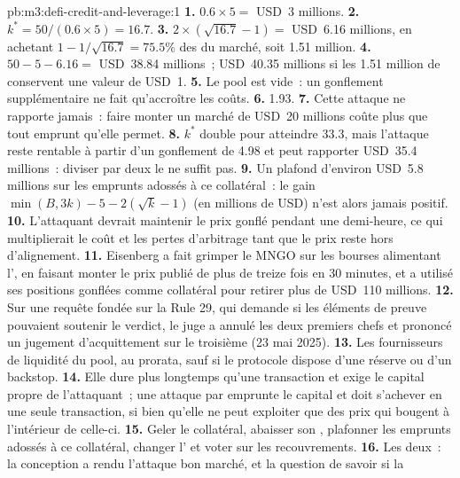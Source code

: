 \begin{solution}{pb:m3:defi-credit-and-leverage:1}
\textbf{1.} $0.6 \times 5 = $ USD~3 millions. \textbf{2.} $k^* = 50/(0.6 \times 5) = 16.7$. \textbf{3.} $2 \times (\sqrt{16.7} - 1) = $ USD~6.16
millions, en achetant $1 - 1/\sqrt{16.7} = 75.5\%$ des  du marché, soit 1.51 million. \textbf{4.} $50 - 5 - 6.16 = $ USD~38.84 millions~; USD~40.35
millions si les 1.51 million de  conservent une valeur de USD~1. \textbf{5.} Le pool est vide~: un gonflement supplémentaire ne fait qu'accroître les coûts. \textbf{6.} 1.93. \textbf{7.} Cette
attaque ne rapporte jamais~: faire monter un marché de USD~20 millions coûte plus que tout emprunt qu'elle permet. \textbf{8.} $k^*$ double pour atteindre 33.3, mais l'attaque reste
rentable à partir d'un gonflement de 4.98 et peut rapporter USD~35.4 millions~: diviser par deux le  ne suffit pas. \textbf{9.} Un plafond d'environ USD~5.8 millions sur les emprunts
adossés à ce collatéral~: le gain $\min(B, 3k) - 5 - 2(\sqrt{k} - 1)$ (en millions de USD) n'est alors jamais positif. \textbf{10.} L'attaquant devrait
maintenir le prix gonflé pendant une demi-heure, ce qui multiplierait le coût et les pertes d'arbitrage tant que le prix reste hors d'alignement. \textbf{11.} Eisenberg a fait grimper le MNGO
sur les bourses alimentant l', en faisant monter le prix publié de plus de treize fois en 30 minutes, et a utilisé ses positions gonflées comme collatéral pour
retirer plus de USD~110 millions. \textbf{12.} Sur une requête fondée sur la Rule 29, qui demande si les éléments de preuve pouvaient soutenir le verdict, le
juge a annulé les deux premiers chefs et prononcé un jugement d'acquittement sur le troisième (23 mai 2025). \textbf{13.} Les fournisseurs de liquidité du pool, au prorata, sauf si le
protocole dispose d'une réserve ou d'un backstop. \textbf{14.} Elle dure plus longtemps qu'une transaction et exige le capital propre de l'attaquant~; une attaque par  emprunte
le capital et doit s'achever en une seule transaction, si bien qu'elle ne peut exploiter que des prix qui bougent à l'intérieur de celle-ci. \textbf{15.} Geler le collatéral, abaisser son
, plafonner les emprunts adossés à ce collatéral, changer l' et voter sur les recouvrements. \textbf{16.} Les deux~: la conception a rendu l'attaque bon marché, et la question de savoir si la

\end{solution}
